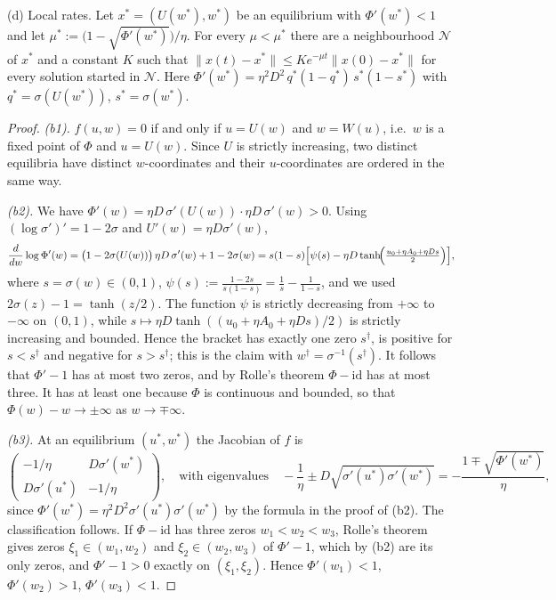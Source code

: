 \begin{theorem}
\smallskip\noindent\textup{(d) Local rates.}
Let $x^\ast=(U(w^\ast),w^\ast)$ be an equilibrium with $\Phi'(w^\ast)<1$ and
let $\mu^\ast:=\bigl(1-\sqrt{\Phi'(w^\ast)}\bigr)/\eta$. For every
$\mu<\mu^\ast$ there are a neighbourhood $\mathcal N$ of $x^\ast$ and a
constant $K$ such that $\|x(t)-x^\ast\|\le Ke^{-\mu t}\|x(0)-x^\ast\|$ for
every solution started in $\mathcal N$. Here
$\Phi'(w^\ast)=\eta^2D^2\,q^\ast(1-q^\ast)\,s^\ast(1-s^\ast)$ with
$q^\ast=\sigma(U(w^\ast))$, $s^\ast=\sigma(w^\ast)$.
\end{theorem}

\begin{proof}
\emph{(b1).} $f(u,w)=0$ if and only if $u=U(w)$ and $w=W(u)$, i.e.\ $w$ is a
fixed point of $\Phi$ and $u=U(w)$. Since $U$ is strictly increasing, two
distinct equilibria have distinct $w$-coordinates and their
$u$-coordinates are ordered in the same way.

\emph{(b2).} We have
$\Phi'(w)=\eta D\,\sigma'(U(w))\cdot\eta D\,\sigma'(w)>0$. Using
$(\log\sigma')'=1-2\sigma$ and $U'(w)=\eta D\sigma'(w)$,
\[
\frac{d}{dw}\log\Phi'(w)=\bigl(1-2\sigma(U(w))\bigr)\,\eta D\,\sigma'(w)+1-2\sigma(w)
=s(1-s)\Bigl[\psi(s)-\eta D\tanh\!\Bigl(\tfrac{u_0+\eta A_0+\eta Ds}{2}\Bigr)\Bigr],
\]
where $s=\sigma(w)\in(0,1)$, $\psi(s):=\frac{1-2s}{s(1-s)}=\frac1s-\frac1{1-s}$,
and we used $2\sigma(z)-1=\tanh(z/2)$. The function $\psi$ is strictly
decreasing from $+\infty$ to $-\infty$ on $(0,1)$, while
$s\mapsto\eta D\tanh((u_0+\eta A_0+\eta Ds)/2)$ is strictly increasing and
bounded. Hence the bracket has exactly one zero $s^\dagger$, is positive
for $s<s^\dagger$ and negative for $s>s^\dagger$; this is the claim with
$w^\dagger=\sigma^{-1}(s^\dagger)$. It follows that $\Phi'-1$ has at most
two zeros, and by Rolle's theorem $\Phi-\mathrm{id}$ has at most three.
It has at least one because $\Phi$ is continuous and bounded, so that
$\Phi(w)-w\to\pm\infty$ as $w\to\mp\infty$.

\emph{(b3).} At an equilibrium $(u^\ast,w^\ast)$ the Jacobian of $f$ is
\[
\begin{pmatrix}-1/\eta& D\sigma'(w^\ast)\\ D\sigma'(u^\ast)&-1/\eta\end{pmatrix},
\quad\text{with eigenvalues}\quad
-\frac1\eta\pm D\sqrt{\sigma'(u^\ast)\sigma'(w^\ast)}
=-\frac{1\mp\sqrt{\Phi'(w^\ast)}}{\eta},
\]
since $\Phi'(w^\ast)=\eta^2D^2\sigma'(u^\ast)\sigma'(w^\ast)$ by the
formula in the proof of (b2). The classification follows. If
$\Phi-\mathrm{id}$ has three zeros $w_1<w_2<w_3$, Rolle's theorem gives
zeros $\xi_1\in(w_1,w_2)$ and $\xi_2\in(w_2,w_3)$ of $\Phi'-1$, which by
(b2) are its only zeros, and $\Phi'-1>0$ exactly on $(\xi_1,\xi_2)$. Hence
$\Phi'(w_1)<1$, $\Phi'(w_2)>1$, $\Phi'(w_3)<1$.


\end{proof}
